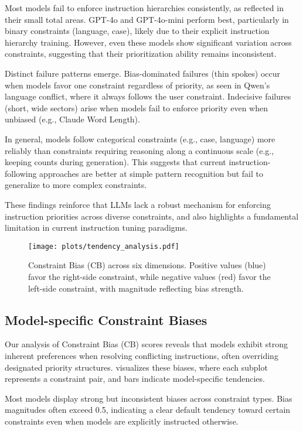 Most models fail to enforce instruction hierarchies consistently, as reflected in their small total areas. GPT-4o and GPT-4o-mini perform best, particularly in binary constraints (language, case), likely due to their explicit instruction hierarchy training. However, even these models show significant variation across constraints, suggesting that their prioritization ability remains inconsistent.

Distinct failure patterns emerge. Bias-dominated failures (thin spokes) occur when models favor one constraint regardless of priority, as seen in Qwen’s language conflict, where it always follows the user constraint. Indecisive failures (short, wide sectors) arise when models fail to enforce priority even when unbiased (e.g., Claude Word Length).

In general, models follow categorical constraints (e.g., case, language) more reliably than constraints requiring reasoning along a continuous scale (e.g., keeping counts during generation). This suggests that current instruction-following approaches are better at simple pattern recognition but fail to generalize to more complex constraints.

These findings reinforce that LLMs lack a robust mechanism for enforcing instruction priorities across diverse constraints, and also highlights a fundamental limitation in current instruction tuning paradigms.


\begin{figure}[t]
    \centering
    \texttt{[image: plots/tendency\_analysis.pdf]}
    \caption{Constraint Bias (CB) across six dimensions. Positive values (blue) favor the right-side constraint, while negative values (red) favor the left-side constraint, with magnitude reflecting bias strength.}
    \label{fig:model_tendency}
\end{figure}

\subsection{Model-specific Constraint Biases}\label{sec:bias} 


Our analysis of Constraint Bias (CB) scores reveals that models exhibit strong inherent preferences when resolving conflicting instructions, often overriding designated priority structures.  visualizes these biases, where each subplot represents a constraint pair, and bars indicate model-specific tendencies. 

Most models display strong but inconsistent biases across constraint types. Bias magnitudes often exceed 0.5, indicating a clear default tendency toward certain constraints even when models are explicitly instructed otherwise.

